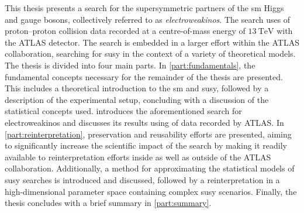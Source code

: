 This thesis presents a search for the supersymmetric partners of the \gls{sm} Higgs and gauge bosons, collectively referred to as \textit{electroweakinos}. The search uses \onethirtynineifb of proton--proton collision data recorded at a centre-of-mass energy of $\SI{13}{\TeV}$ with the ATLAS detector. The search is embedded in a larger effort within the ATLAS collaboration, searching for \gls{susy} in the context of a variety of theoretical models. The thesis is divided into four main parts. In \cref{part:fundamentals}, the fundamental concepts necessary for the remainder of the thesis are presented. This includes a theoretical introduction to the \gls{sm} and \gls{susy}, followed by a description of the experimental setup, concluding with a discussion of the statistical concepts used.  introduces the aforementioned search for electroweakinos and discusses its results using \onethirtynineifb of data recorded by ATLAS. In \cref{part:reinterpretation}, preservation and reusability efforts are presented, aiming to significantly increase the scientific impact of the search by making it readily available to reinterpretation efforts inside as well as outside of the ATLAS collaboration. Additionally, a method for approximating the statistical models of \gls{susy} searches is introduced and discussed, followed by a reinterpretation in a high-dimensional parameter space containing complex \gls{susy} scenarios. Finally, the thesis concludes with a brief summary in \cref{part:summary}.

